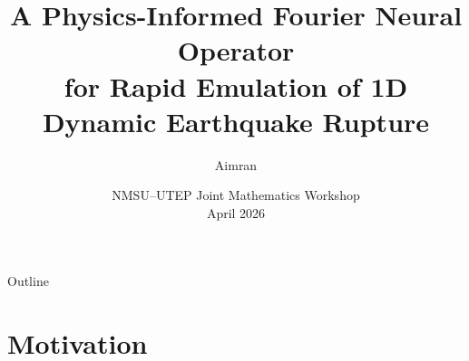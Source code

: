 \documentclass[aspectratio=169,12pt]{beamer}
\title[PINO for Earthquake Rupture]{%
  A Physics-Informed Fourier Neural Operator\\
  for Rapid Emulation of 1D Dynamic Earthquake Rupture}
\author[Aimran]{Aimran}
\institute[NMSU]{%
  Department of Mathematical Sciences\\
  New Mexico State University}
\date{NMSU--UTEP Joint Mathematics Workshop\\April 2026}
\begin{document}

\begin{frame}
  \titlepage
\end{frame}

\begin{frame}{Outline}
  \tableofcontents[hideallsubsections]
\end{frame}

\section{Motivation}
\end{document}

